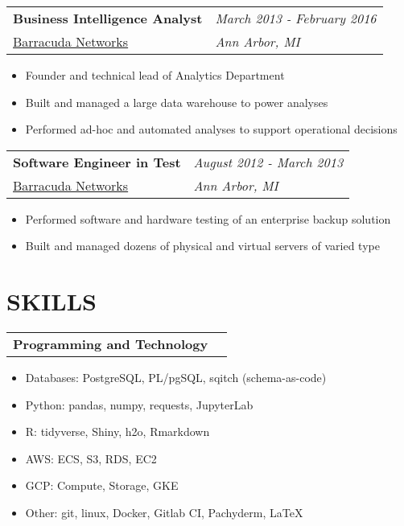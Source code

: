 \documentclass[margin,line]{res}
\begin{document}
\begin{resume}
\begin{tabular}{p{4.4in} l}
  {\bf Business Intelligence Analyst} & \emph{March 2013 - February 2016}\\
  \href{https://www.barracuda.com/}{Barracuda Networks} & \emph{Ann Arbor, MI}
\end{tabular}
\vspace{2pt}
\begin{itemize}\itemsep -2pt
  \item Founder and technical lead of Analytics Department
  \item Built and managed a large data warehouse to power analyses
  \item Performed ad-hoc and automated analyses to support operational decisions
\end{itemize}

\begin{tabular}{p{4.4in} l}
  {\bf Software Engineer in Test} & \emph{August 2012 - March 2013}\\
  \href{https://www.barracuda.com/}{Barracuda Networks} & \emph{Ann Arbor, MI}
\end{tabular}
\vspace{2pt}
\begin{itemize}\itemsep -2pt
  \item Performed software and hardware testing of an enterprise backup solution
  \item Built and managed dozens of physical and virtual servers of varied type
\end{itemize}


\vspace{3pt}


\section{SKILLS}

\begin{tabular}{p{4.4in} l}
  {\bf Programming and Technology}
\end{tabular}
\vspace{2pt}
\begin{itemize} \itemsep -2pt
  \item Databases: PostgreSQL, PL/pgSQL, sqitch (schema-as-code)
  \item Python: pandas, numpy, requests, JupyterLab
  \item R: tidyverse, Shiny, h2o, Rmarkdown
  \item AWS: ECS, S3, RDS, EC2
  \item GCP: Compute, Storage, GKE
  \item Other: git, linux, Docker, Gitlab CI, Pachyderm, \LaTeX
\end{itemize}



\end{resume}
\end{document}

